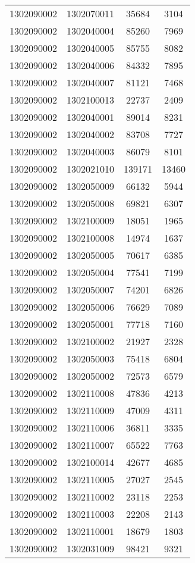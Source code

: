 \begin{longtable}[h]{llcc}
		1302090002 & 1302070011 & 35684 & 3104\\
		1302090002 & 1302040004 & 85260 & 7969\\
		1302090002 & 1302040005 & 85755 & 8082\\
		1302090002 & 1302040006 & 84332 & 7895\\
		1302090002 & 1302040007 & 81121 & 7468\\
		1302090002 & 1302100013 & 22737 & 2409\\
		1302090002 & 1302040001 & 89014 & 8231\\
		1302090002 & 1302040002 & 83708 & 7727\\
		1302090002 & 1302040003 & 86079 & 8101\\
		1302090002 & 1302021010 & 139171 & 13460\\
		1302090002 & 1302050009 & 66132 & 5944\\
		1302090002 & 1302050008 & 69821 & 6307\\
		1302090002 & 1302100009 & 18051 & 1965\\
		1302090002 & 1302100008 & 14974 & 1637\\
		1302090002 & 1302050005 & 70617 & 6385\\
		1302090002 & 1302050004 & 77541 & 7199\\
		1302090002 & 1302050007 & 74201 & 6826\\
		1302090002 & 1302050006 & 76629 & 7089\\
		1302090002 & 1302050001 & 77718 & 7160\\
		1302090002 & 1302100002 & 21927 & 2328\\
		1302090002 & 1302050003 & 75418 & 6804\\
		1302090002 & 1302050002 & 72573 & 6579\\
		1302090002 & 1302110008 & 47836 & 4213\\
		1302090002 & 1302110009 & 47009 & 4311\\
		1302090002 & 1302110006 & 36811 & 3335\\
		1302090002 & 1302110007 & 65522 & 7763\\
		1302090002 & 1302100014 & 42677 & 4685\\
		1302090002 & 1302110005 & 27027 & 2545\\
		1302090002 & 1302110002 & 23118 & 2253\\
		1302090002 & 1302110003 & 22208 & 2143\\
		1302090002 & 1302110001 & 18679 & 1803\\
		1302090002 & 1302031009 & 98421 & 9321\\

\end{longtable}
